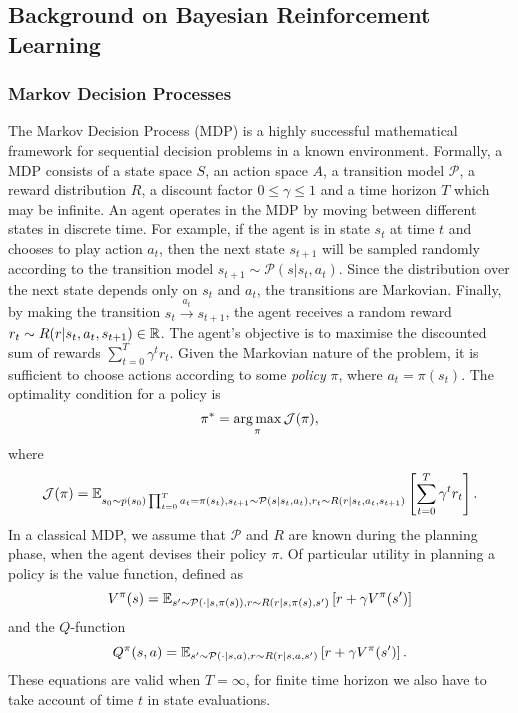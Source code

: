 \documentclass[a4paper, 10pt]{report}
\theoremstyle{plain}
\begin{document}
	
	\subsection{Background on Bayesian Reinforcement Learning}
	\subsubsection{Markov Decision Processes}
	The Markov Decision Process (MDP) \citep{bellman1957markovian,duff2002optimal} is a highly successful mathematical framework for sequential decision problems in a known environment.
	Formally, a MDP consists of a state space $S$, an action space $A$, a transition model $\mathcal{P}$, a reward distribution $R$, a discount factor $0 \le \gamma \le 1$ and a time horizon $T$ which may be infinite.
	An agent operates in the MDP by moving between different states in discrete time.
	For example, if the agent is in state $s_t$ at time $t$ and chooses to play action $a_t$, then the next state $s_{t+1}$ will be sampled randomly according to the transition model $s_{t+1} \sim \mathcal{P}(s|s_t,a_t)$. Since the distribution over the next state depends only on $s_t$ and $a_t$, the transitions are Markovian.
	Finally, by making the transition $s_t \overset{a_{t}}{\longrightarrow} s_{t+1}$, the agent receives a random reward $r_t \sim R(r|s_t,a_t,s_{t+1}) \in \mathbb{R}$.
	The agent's objective is to maximise the discounted sum of rewards $\sum_{t=0}^T \gamma^t r_t$.
	Given the Markovian nature of the problem, it is sufficient to choose actions according to some \emph{policy} $\pi$, where $a_t = \pi(s_t)$.
	The optimality condition for a policy is
	\begin{equation}
	\pi^* = \operatorname*{arg\,max}_{\pi} \mathcal{J}(\pi),
	\end{equation}
	where
	\begin{equation}
	\mathcal{J}(\pi) = \mathbb{E}_{ s_0\sim p(s_0) \prod_{t=0}^T a_t=\pi(s_t), s_{t+1}\sim \mathcal{P}(s|s_t,a_t), r_t \sim R(r|s_t,a_t,s_{t+1}) }\left[ \sum_{t=0}^T \gamma^t r_t \right].
	\end{equation}
	In a classical MDP, we assume that $\mathcal{P}$ and $R$ are known during the planning phase, when the agent devises their policy $\pi$.
	Of particular utility in planning a policy is the value function, defined as
	\begin{equation}
	V^\pi(s) = \mathbb{E}_{s'\sim \mathcal{P}(\cdot|s,\pi(s)), r \sim R(r|s,\pi(s),s')}\left[ r + \gamma V^\pi(s') \right]
	\end{equation}
	and the $Q$-function
	\begin{equation}
	Q^\pi(s, a) = \mathbb{E}_{s'\sim \mathcal{P}(\cdot|s,a), r \sim R(r|s,a,s')}\left[ r + \gamma V^\pi(s') \right].
	\end{equation}
	These equations are valid when $T=\infty$, for finite time horizon we also have to take account of time $t$ in state evaluations.
	
\end{document}
